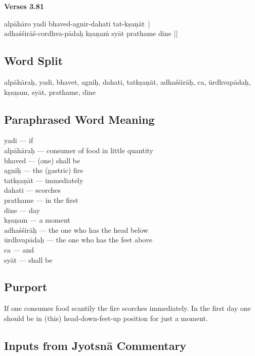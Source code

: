\noindent \textbf{Verses 3.81}

\begin{shloka}
alpāhāro yadi bhaved-agnir-dahati tat-kṣaṇāt |\\
adhaśśirāś-cordhva-pādaḥ kṣaṇaṁ syāt prathame dine ||
\end{shloka}

\subsection*{Word Split}

alpāhāraḥ, yadi, bhavet, agniḥ, dahati, tatkṣaṇāt, adhaśśirāḥ, ca, ūrdhvapādaḥ, kṣaṇam, syāt, prathame, dine

\subsection*{Paraphrased Word Meaning}

\begin{multicols}{2}
yadi --- if \\
alpāhāraḥ ---  consumer of food in little quantity\\
bhaved --- (one) shall be\\
agniḥ --- the (gastric) fire \\
tatkṣaṇāt ---  immediately\\ 
dahati --- scorches  \\
prathame --- in the first   \\
dine --- day\\
kṣaṇam --- a moment \\
adhaśśirāḥ --- the one who has the head below \\
ūrdhvapādaḥ ---  the one who has the feet above\\ 
ca --- and \\
syāt --- shall be
\end{multicols}

\subsection*{Purport}

If one consumes food scantily the fire scorches immediately. In the first day one should be in (this) head-down-feet-up position for just a moment. 

\subsection*{Inputs from Jyotsnā Commentary}


